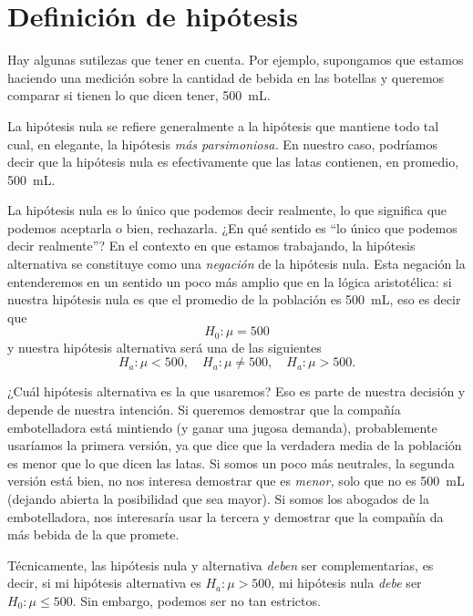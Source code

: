 \section{Definición de hipótesis}

Hay algunas sutilezas que tener en cuenta. Por ejemplo, supongamos que estamos haciendo una medición sobre la cantidad de bebida en las botellas y queremos comparar si tienen lo que dicen tener, \qty{500}{\milli\liter}. 

La hipótesis nula se refiere generalmente a la hipótesis que mantiene todo tal cual, en elegante, la hipótesis \emph{más parsimoniosa.} En nuestro caso, podríamos decir que la hipótesis nula es efectivamente que las latas contienen, en promedio, \qty{500}{\milli\liter}.

La hipótesis nula es lo único que podemos decir realmente, lo que significa que podemos aceptarla o bien, rechazarla. ¿En qué sentido es \enquote{lo único que podemos decir realmente}? En el contexto en que estamos trabajando, la hipótesis alternativa se constituye como una \emph{negación} de la hipótesis nula. Esta negación la entenderemos en un sentido un poco más amplio que en la lógica aristotélica: si nuestra hipótesis nula es que el promedio de la población es \qty{500}{\milli\liter}, eso es decir que \[H_0: \mu = 500\] y nuestra hipótesis alternativa será una de las siguientes \[H_a: \mu<500,\quad H_a: \mu \neq 500,\quad H_a: \mu>500.\]

¿Cuál hipótesis alternativa es la que usaremos? Eso es parte de nuestra decisión y depende de nuestra intención. Si queremos demostrar que la compañía embotelladora está mintiendo (y ganar una jugosa demanda), probablemente usaríamos la primera versión, ya que dice que la verdadera media de la población es menor que lo que dicen las latas. Si somos un poco más neutrales, la segunda versión está bien, no nos interesa demostrar que es \emph{menor,} solo que no es \qty{500}{\milli\liter} (dejando abierta la posibilidad que sea mayor). Si somos los abogados de la embotelladora, nos interesaría usar la tercera y demostrar que la compañía da más bebida de la que promete.

\formal
Técnicamente, las hipótesis nula y alternativa \emph{deben} ser complementarias, es decir, si mi hipótesis alternativa es \(H_a: \mu>500\), mi hipótesis nula \emph{debe} ser \(H_0: \mu \leq 500\). Sin embargo, podemos ser no tan estrictos.

